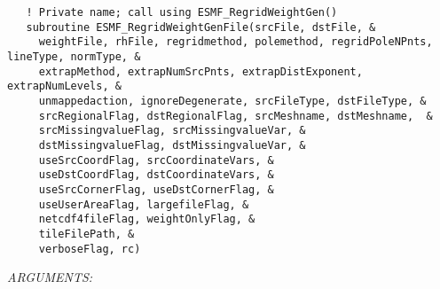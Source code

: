    \label{api:esmf_regridweightgenfile}
\begin{verbatim}   ! Private name; call using ESMF_RegridWeightGen()
   subroutine ESMF_RegridWeightGenFile(srcFile, dstFile, &
     weightFile, rhFile, regridmethod, polemethod, regridPoleNPnts, lineType, normType, &
     extrapMethod, extrapNumSrcPnts, extrapDistExponent, extrapNumLevels, &
     unmappedaction, ignoreDegenerate, srcFileType, dstFileType, &
     srcRegionalFlag, dstRegionalFlag, srcMeshname, dstMeshname,  &
     srcMissingvalueFlag, srcMissingvalueVar, &
     dstMissingvalueFlag, dstMissingvalueVar, &
     useSrcCoordFlag, srcCoordinateVars, &
     useDstCoordFlag, dstCoordinateVars, &
     useSrcCornerFlag, useDstCornerFlag, &
     useUserAreaFlag, largefileFlag, &
     netcdf4fileFlag, weightOnlyFlag, &
     tileFilePath, &
     verboseFlag, rc)
 \end{verbatim}{\em ARGUMENTS:}
